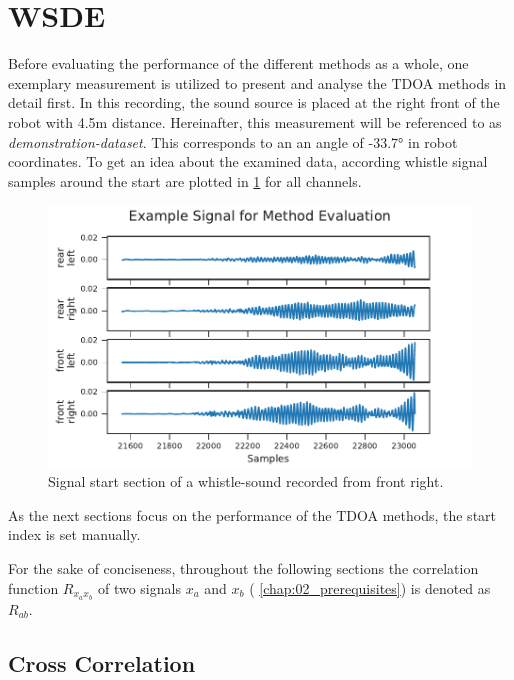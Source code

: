 \section{\acl{WSDE}}
\label{sec:04_tdoaSingle}

Before evaluating the performance of the different methods as a whole,
one exemplary measurement is utilized
to present and analyse the \ac{TDOA} methods in detail first.
In this recording, the sound source is placed at the right front
of the robot with 4.5\si{m} distance.
Hereinafter, this measurement will be referenced to as \textit{demonstration-dataset}.
This corresponds to an an angle of -33.7\si{\degree} in robot coordinates.
To get an idea about the examined data, according whistle signal samples around the
start are plotted in \cref{fig:04_tdoaSignal} for all channels.
\begin{figure}[ht]
	\centering
	\includegraphics[]{figures/evaluation/cc_frontRight_1_signal}
	\caption{Signal start section of a whistle-sound recorded from front right.}
	\label{fig:04_tdoaSignal}
\end{figure}

As the next sections focus on the performance of the \ac{TDOA} methods,
the start index is set manually.

For the sake of conciseness, throughout the following sections the correlation
function $R_{x_ax_b}$ of two signals $x_a$ and $x_b$  (\cf
\cref{chap:02_prerequisites}) is denoted as $R_{ab}$.


\subsection{Cross Correlation}
\label{subsec:04_ccSingle}

